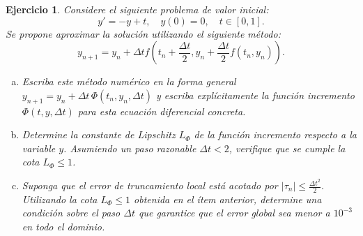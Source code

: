 \documentclass[12pt]{article}%
\newtheorem{exercise}{Ejercicio}
\begin{document}
\vskip 0.5cm

\begin{exercise}
Considere el siguiente problema de valor inicial:$$y' = -y + t, \quad y(0) = 0, \quad t \in [0, 1].$$Se propone aproximar la solución utilizando el siguiente método:$$y_{n+1} = y_n + \Delta t f\left(t_n + \frac{\Delta t}{2}, y_n + \frac{\Delta t}{2} f(t_n, y_n)\right).$$
\begin{enumerate}[(a)]
\item Escriba este método numérico en la forma general $y_{n+1} = y_n + \Delta t \,\Phi(t_n, y_n, \Delta t)$ y escriba explícitamente la función incremento $\Phi(t, y, \Delta t)$ para esta ecuación diferencial concreta.

\item Determine la constante de Lipschitz $L_\Phi$ de la función incremento respecto a la variable $y$. Asumiendo un paso razonable $\Delta t < 2$, verifique que se cumple la cota $L_\Phi \le 1$.

\item Suponga que el error de truncamiento local está acotado por $|\tau_n| \le \frac{\Delta t^2}{2}$. Utilizando la cota $L_\Phi \le 1$ obtenida en el ítem anterior, determine una condición sobre el paso $\Delta t$ que garantice que el error global sea menor a $10^{-3}$ en todo el dominio.
\end{enumerate}
\end{exercise}


\end{document}
